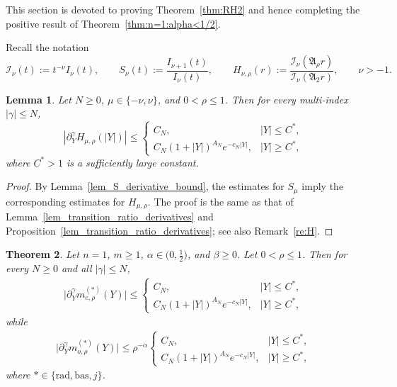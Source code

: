 \documentclass[12pt]{amsart}
\newtheorem{theorem}{Theorem}[section]
\newtheorem{lemma}[theorem]{Lemma}
\begin{document}
This section is devoted to proving Theorem~\ref{thm:RH2} and hence completing the positive result of Theorem~\ref{thm:n=1:alpha<1/2}.

Recall the notation
\begin{equation*}
    \mathcal{I}_\nu (t) := t^{-\nu} I_\nu(t), \qquad S_\nu(t):= \frac{I_{\nu+1}(t)}{I_\nu(t)},\qquad H_{\nu,\rho}(r):= \frac{\mathcal{I}_\nu(\mathfrak A_\rho r)}{\mathcal{I}_\nu(\mathfrak A_2 r)}, \qquad \nu>-1.
\end{equation*}






\begin{lemma}\label{lem:Poisson:n=1}
Let $N\ge 0$, $\mu\in \{-\nu, \nu \}$, and $0<\rho \le 1$. Then for every multi-index $|\gamma|\le N$,
\begin{equation*}
        |\partial_Y^{\gamma} H_{\mu,\rho}(|Y|)| \le \begin{cases}
            C_N, & |Y|\le C^*,\\[4pt]
            C_N (1+|Y|)^{A_N} e^{-c_N |Y|}, & |Y|\ge C^*,
        \end{cases}
\end{equation*}
where $C^*>1$ is a sufficiently large constant.
\end{lemma}

\begin{proof}
By Lemma~\ref{lem_S_derivative_bound}, the estimates for $S_\mu$ imply the corresponding estimates for $H_{\mu,\rho}$. The proof is the same as that of Lemma~\ref{lem_transition_ratio_derivatives} and Proposition~\ref{lem_transition_ratio_derivatives}; see also Remark~\ref{re:H}.
\end{proof}

\begin{theorem}\label{prop:Poisson:n=1}
Let $n= 1$, $m\ge 1$, $\alpha\in \big(0,\frac{1}{2} \big)$, and $\beta \ge 0$. Let $0<\rho\le 1$. Then for every $N\ge 0$ and all $|\gamma|\le N$,
\begin{align}\label{eq:prop:Poisson:n=1:even}
    \bigl| \partial_Y^{\gamma} m_{e,\rho}^{(*)}(Y) \bigr| \le \begin{cases}
        C_N, & |Y|\le C^*,\\[4pt]
        C_N (1+|Y|)^{A_N} e^{-c_N |Y|}, & |Y|\ge C^*,
    \end{cases}
\end{align}
while
\begin{align}\label{eq:prop:Poisson:n=1:odd}
    \bigl| \partial_Y^{\gamma} m_{o,\rho}^{(*)}(Y) \bigr| \le \rho^{-\alpha} \begin{cases}
        C_N, & |Y|\le C^*,\\[4pt]
        C_N (1+|Y|)^{A_N} e^{-c_N |Y|}, & |Y|\ge C^*,
    \end{cases}
\end{align}
where $*\in\{\mathrm{rad}, \mathrm{bas},j\}$.
\end{theorem}
\end{document}
